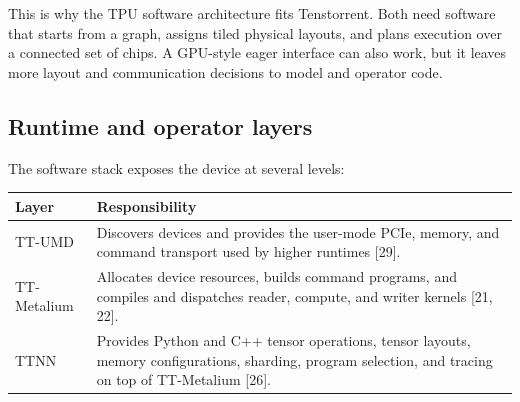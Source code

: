 \documentclass[
  10pt,
  american,
  10pt,
  letterpaper]{article}
\begin{document}
\endgroup

This is why the TPU software architecture fits Tenstorrent. Both need
software that starts from a graph, assigns tiled physical layouts, and
plans execution over a connected set of chips. A GPU-style eager
interface can also work, but it leaves more layout and communication
decisions to model and operator code.

\hypertarget{runtime-and-operator-layers}{%
\subsection{Runtime and operator
layers}\label{runtime-and-operator-layers}}

The software stack exposes the device at several levels:

\begin{longtable}[]{@{}ll@{}}
\toprule
\begin{minipage}[b]{0.47\columnwidth}\raggedright
Layer\strut
\end{minipage} & \begin{minipage}[b]{0.47\columnwidth}\raggedright
Responsibility\strut
\end{minipage}\tabularnewline
\midrule
\endhead
\begin{minipage}[t]{0.47\columnwidth}\raggedright
TT-UMD\strut
\end{minipage} & \begin{minipage}[t]{0.47\columnwidth}\raggedright
Discovers devices and provides the user-mode PCIe, memory, and command
transport used by higher runtimes {[}29{]}.\strut
\end{minipage}\tabularnewline
\begin{minipage}[t]{0.47\columnwidth}\raggedright
TT-Metalium\strut
\end{minipage} & \begin{minipage}[t]{0.47\columnwidth}\raggedright
Allocates device resources, builds command programs, and compiles and
dispatches reader, compute, and writer kernels {[}21, 22{]}.\strut
\end{minipage}\tabularnewline
\begin{minipage}[t]{0.47\columnwidth}\raggedright
TTNN\strut
\end{minipage} & \begin{minipage}[t]{0.47\columnwidth}\raggedright
Provides Python and C++ tensor operations, tensor layouts, memory
configurations, sharding, program selection, and tracing on top of
TT-Metalium {[}26{]}.\strut
\end{minipage}\tabularnewline

\end{longtable}
\end{document}
